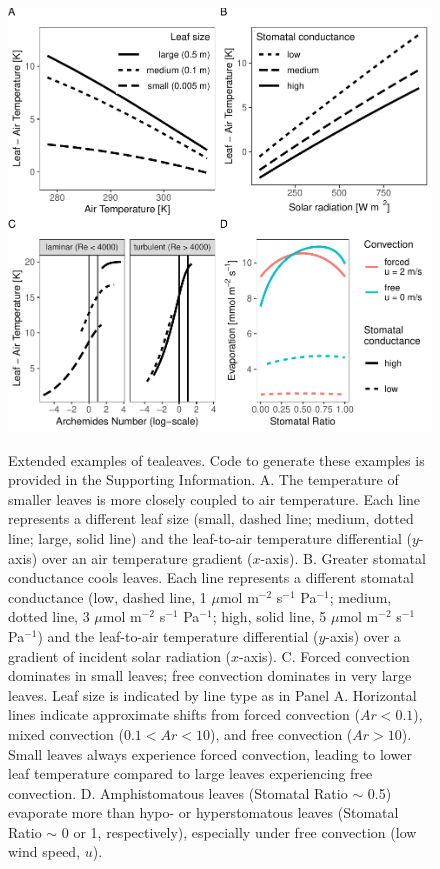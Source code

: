 \documentclass[11pt, oneside]{article}
\newcommand{\pkg}[1]{{\fontseries{b}\selectfont #1}}
\newcommand{\tealeaves}{\pkg{tealeaves}}
\begin{document}
\begin{figure}[ht]
\centerline{\includegraphics[width=\textwidth,height=\textwidth]{../figures/fig1.pdf}}
\end{figure}

\begin{figure}[t!]
\caption{Extended examples of \tealeaves. Code to generate these examples is provided in the Supporting Information. A. The temperature of smaller leaves is more closely coupled to air temperature. Each line represents a different leaf size (small, dashed line; medium, dotted line; large, solid line) and the leaf-to-air temperature differential ($y$-axis) over an air temperature gradient ($x$-axis). B. Greater stomatal conductance cools leaves. Each line represents a different stomatal conductance (low, dashed line, 1 $\mu$mol m$^{-2}$ s$^{-1}$ Pa$^{-1}$; medium, dotted line, 3 $\mu$mol m$^{-2}$ s$^{-1}$ Pa$^{-1}$; high, solid line, 5 $\mu$mol m$^{-2}$ s$^{-1}$ Pa$^{-1}$) and the leaf-to-air temperature differential ($y$-axis) over a gradient of incident solar radiation ($x$-axis). C. Forced convection dominates in small leaves; free convection dominates in very large leaves. Leaf size is indicated by line type as in Panel A. Horizontal lines indicate approximate shifts from forced convection ($\mathit{Ar} < 0.1$), mixed convection ($0.1 < \mathit{Ar} < 10$), and free convection ($\mathit{Ar} > 10$). Small leaves always experience forced convection, leading to lower leaf temperature compared to large leaves experiencing free convection. D. Amphistomatous leaves (Stomatal Ratio $\sim$ 0.5) evaporate more than hypo- or hyperstomatous leaves (Stomatal Ratio $\sim$ 0 or 1, respectively), especially under free convection (low wind speed, $u$).}
\label{fig:fig1}
\end{figure}
\end{document}
